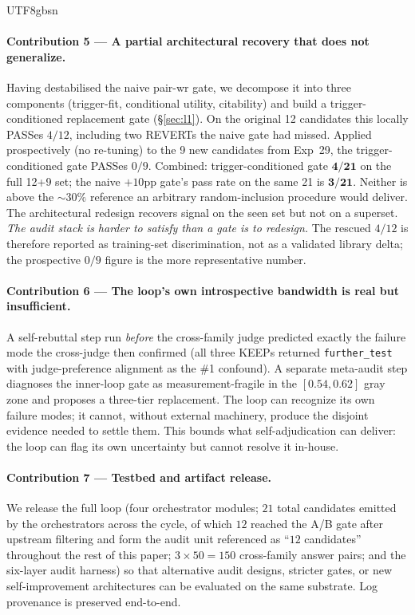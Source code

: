 \documentclass{article}
\begin{document}
\begin{CJK*}{UTF8}{gbsn}
\paragraph{Contribution 5 — A partial architectural recovery that does
not generalize.} Having destabilised the naive pair-wr gate, we
decompose it into three components (trigger-fit, conditional utility,
citability) and build a trigger-conditioned replacement gate
(\S\ref{sec:l1}). On the original 12 candidates this
locally PASSes \(4/12\), including two REVERTs the naive gate had
missed. Applied prospectively (no re-tuning) to the 9 new
candidates from Exp~29, the trigger-conditioned gate PASSes
\(0/9\). Combined: trigger-conditioned gate \(\mathbf{4/21}\) on
the full 12+9 set; the naive \(+10\)pp gate's pass rate on the
same 21 is \(\mathbf{3/21}\). Neither is above the \(\sim 30\%\)
reference an arbitrary random-inclusion procedure would
deliver.
The architectural redesign recovers signal on the seen set but not
on a superset. \emph{The audit stack is harder to satisfy than a gate
is to redesign.} The rescued \(4/12\) is therefore reported as
training-set discrimination, not as a validated library delta;
the prospective \(0/9\) figure is the more representative number.

\paragraph{Contribution 6 — The loop's own introspective bandwidth
is real but insufficient.} A self-rebuttal step run \emph{before} the
cross-family judge predicted exactly the failure mode the cross-judge
then confirmed (all three KEEPs returned \texttt{further\_test} with
judge-preference alignment as the \#1 confound). A separate
meta-audit step diagnoses the inner-loop gate as measurement-fragile
in the \([0.54, 0.62]\) gray zone and proposes a three-tier
replacement. The loop can recognize its own failure modes; it
cannot, without external machinery, produce the disjoint evidence
needed to settle them. This bounds what self-adjudication can
deliver: the loop can flag its own uncertainty but cannot resolve
it in-house.

\paragraph{Contribution 7 — Testbed and artifact release.} We release
the full loop (four orchestrator modules; \(21\) total candidates
emitted by the orchestrators across the cycle, of which \(12\)
reached the A/B gate after upstream filtering and form the audit
unit referenced as ``\(12\) candidates'' throughout the rest of
this paper; \(3 \times 50 = 150\) cross-family answer pairs; and
the six-layer audit harness) so that alternative audit designs,
stricter gates, or new self-improvement architectures can be
evaluated on the same substrate. Log provenance is preserved end-to-end.


\end{CJK*}
\end{document}
